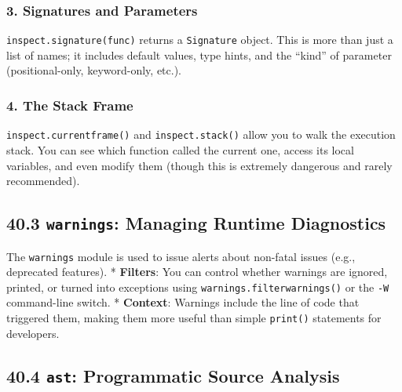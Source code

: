 \hypertarget{signatures-and-parameters}{%
\subsubsection{3. Signatures and
Parameters}\label{signatures-and-parameters}}

\passthrough{\lstinline!inspect.signature(func)!} returns a
\passthrough{\lstinline!Signature!} object. This is more than just a
list of names; it includes default values, type hints, and the ``kind''
of parameter (positional-only, keyword-only, etc.).

\hypertarget{the-stack-frame}{%
\subsubsection{4. The Stack Frame}\label{the-stack-frame}}

\passthrough{\lstinline!inspect.currentframe()!} and
\passthrough{\lstinline!inspect.stack()!} allow you to walk the
execution stack. You can see which function called the current one,
access its local variables, and even modify them (though this is
extremely dangerous and rarely recommended).

\hypertarget{warnings-managing-runtime-diagnostics}{%
\subsection{\texorpdfstring{40.3 \texttt{warnings}: Managing Runtime
Diagnostics}{40.3 warnings: Managing Runtime Diagnostics}}\label{warnings-managing-runtime-diagnostics}}

The \passthrough{\lstinline!warnings!} module is used to issue alerts
about non-fatal issues (e.g., deprecated features). * \textbf{Filters}:
You can control whether warnings are ignored, printed, or turned into
exceptions using \passthrough{\lstinline!warnings.filterwarnings()!} or
the \passthrough{\lstinline!-W!} command-line switch. *
\textbf{Context}: Warnings include the line of code that triggered them,
making them more useful than simple \passthrough{\lstinline!print()!}
statements for developers.

\hypertarget{ast-programmatic-source-analysis}{%
\subsection{\texorpdfstring{40.4 \texttt{ast}: Programmatic Source
Analysis}{40.4 ast: Programmatic Source Analysis}}\label{ast-programmatic-source-analysis}}

